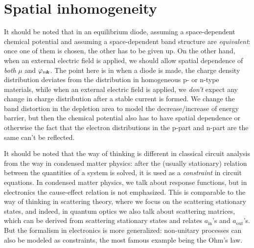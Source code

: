 \documentclass[hyperref, a4paper]{article}
\begin{document}
\section{Spatial inhomogeneity}

It should be noted that in an equilibrium diode, 
assuming a space-dependent chemical potential 
and assuming a space-dependent band structure 
are \emph{equivalent}:
once one of them is chosen,
the other has to be given up.
On the other hand, 
when an external electric field is applied,
we should allow spatial dependence of \emph{both} $\mu$ and $\varphi_{n \vb*{k}}$.
The point here is in when a diode is made,
the charge density distribution deviates from 
the distribution in homogeneous p- or n-type materials,
while when an external electric field is applied,
we \emph{don't} expect any change in charge distribution after a stable current is formed.
We change the band distortion in the depletion area 
to model the decrease/increase of energy barrier,
but then the chemical potential also has to have spatial dependence
or otherwise the fact that 
the electron distributions in the p-part and n-part are the same can't be reflected.

It should be noted that the way of thinking is different in classical circuit analysis
from the way in condensed matter physics:
after the (usually stationary) relation between the quantities of a system is solved,
it is used as a \emph{constraint} 
in circuit equations.
In condensed matter physics, we talk about response functions,
but in electronics the cause-effect relation is not emphasized.
This is comparable to the way of thinking in scattering theory,
where we focus on the scattering stationary states,
and indeed, in quantum optics we also talk about scattering matrices,
which can be derived from scattering stationary states 
and relates $a_{\text{in}}$'s and $a_{\text{out}}$'s.
But the formalism in electronics is more generalized:
non-unitary processes can also be modeled as constraints,
the most famous example being the Ohm's law.
\end{document}
